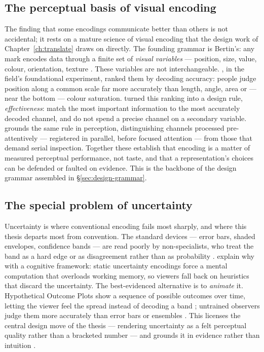 \subsection{The perceptual basis of visual encoding}
\label{subsec:encoding}

The finding that some encodings communicate better than others is not accidental; it rests on a mature science of visual encoding that the design work of Chapter~\ref{ch:translate} draws on directly. The founding grammar is Bertin's: any mark encodes data through a finite set of \emph{visual variables} --- position, size, value, colour, orientation, texture \citep{bertin1983}. These variables are not interchangeable. \citet{clevelandmcgill1984}, in the field's foundational experiment, ranked them by decoding accuracy: people judge position along a common scale far more accurately than length, angle, area or --- near the bottom --- colour saturation. \citet{munzner2014} turned this ranking into a design rule, \emph{effectiveness}: match the most important information to the most accurately decoded channel, and do not spend a precise channel on a secondary variable. \citet{ware2021} grounds the same rule in perception, distinguishing channels processed pre-attentively --- registered in parallel, before focused attention --- from those that demand serial inspection. Together these establish that encoding is a matter of measured perceptual performance, not taste, and that a representation's choices can be defended or faulted on evidence. This is the backbone of the design grammar assembled in §\ref{sec:design-grammar}.

\subsection{The special problem of uncertainty}
\label{subsec:uncertainty}

Uncertainty is where conventional encoding fails most sharply, and where this thesis departs most from convention. The standard devices --- error bars, shaded envelopes, confidence bands --- are read poorly by non-specialists, who treat the band as a hard edge or as disagreement rather than as probability \citep{mcmahon2015, spiegelhalter2017}. \citet{padilla2018} explain why with a cognitive framework: static uncertainty encodings force a mental computation that overloads working memory, so viewers fall back on heuristics that discard the uncertainty. The best-evidenced alternative is to \emph{animate} it. Hypothetical Outcome Plots show a sequence of possible outcomes over time, letting the viewer feel the spread instead of decoding a band \citep{hullman2015hops}; untrained observers judge them more accurately than error bars or ensembles \citep{kale2019hops}. This licenses the central design move of the thesis --- rendering uncertainty as a felt perceptual quality rather than a bracketed number --- and grounds it in evidence rather than intuition \citep{padillakay2022}.

